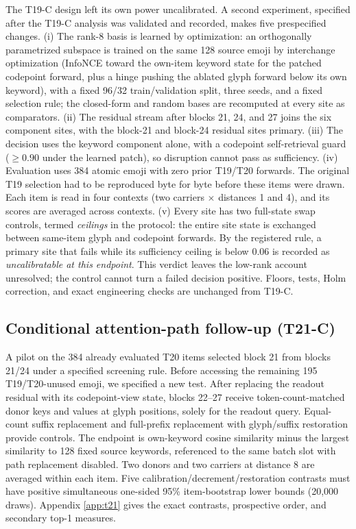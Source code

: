 \documentclass{article}
\begin{document}
The T19-C design left its own power uncalibrated. A second experiment,
specified after the T19-C analysis was validated and recorded, makes
five prespecified changes. (i) The rank-8 basis is learned by optimization:
an orthogonally parametrized subspace is trained on the same 128 source emoji
by interchange optimization (InfoNCE toward the own-item keyword state for
the patched codepoint forward, plus a hinge pushing the ablated glyph forward
below its own keyword), with a fixed 96/32 train/validation split, three
seeds, and a fixed selection rule; the closed-form and random bases are
recomputed at every site as comparators. (ii) The residual stream after
blocks 21, 24, and 27 joins the six component sites, with the block-21 and
block-24 residual sites primary. (iii) The decision uses the keyword
component alone, with a codepoint self-retrieval guard ($\geq0.90$ under the
learned patch), so disruption cannot pass as sufficiency. (iv) Evaluation
uses 384 atomic emoji with zero prior T19/T20 forwards. The original T19
selection had to be reproduced byte for byte before these items were drawn.
Each item is read in four contexts (two carriers $\times$ distances 1 and 4),
and its scores are averaged across contexts. (v) Every site has two
full-state swap controls, termed \emph{ceilings} in the protocol: the entire
site state is exchanged between same-item glyph and codepoint forwards. By
the registered rule, a primary site that fails while its sufficiency ceiling
is below $0.06$ is recorded as \emph{uncalibratable at this endpoint}.
This verdict leaves the low-rank account unresolved; the control cannot turn
a failed decision positive. Floors, tests, Holm correction, and exact
engineering checks are unchanged from T19-C.

\subsection{Conditional attention-path follow-up (T21-C)}
\label{sec:t21}

A pilot on the 384 already evaluated T20 items selected block 21 from
blocks 21/24 under a specified screening rule. Before accessing the remaining
195 T19/T20-unused emoji, we specified a new test. After replacing the
readout residual with its codepoint-view state, blocks 22--27 receive
token-count-matched donor keys and values at glyph positions, solely for the
readout query. Equal-count suffix replacement and full-prefix replacement
with glyph/suffix restoration provide controls. The endpoint is own-keyword
cosine similarity minus the largest similarity to 128 fixed source keywords,
referenced to the same batch slot with path replacement disabled. Two donors
and two carriers at distance 8 are averaged within each item. Five
calibration/decrement/restoration contrasts must have positive simultaneous
one-sided 95\% item-bootstrap lower bounds (20,000 draws). Appendix
\ref{app:t21} gives the exact contrasts, prospective order, and secondary
top-1 measures.
\end{document}
